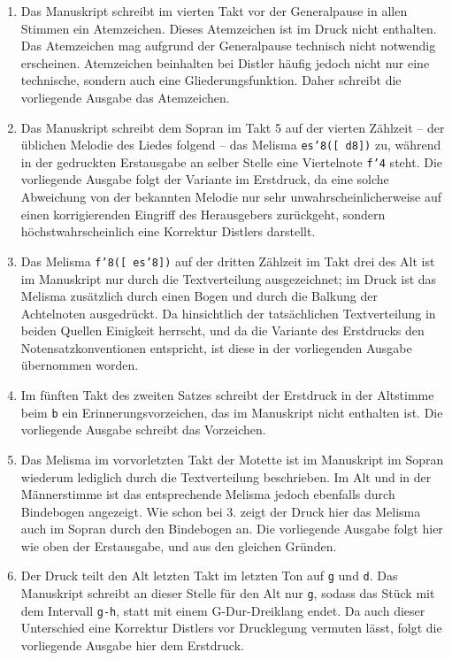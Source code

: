 \documentclass[a4paper]{book}
\begin{document}
\begin{multicols}{2}
\begin{enumerate}
\item
  Das Manuskript schreibt im vierten Takt vor der Generalpause in allen
  Stimmen ein Atemzeichen. Dieses Atemzeichen ist im Druck nicht
  enthalten. Das Atemzeichen mag aufgrund der Generalpause technisch
  nicht notwendig erscheinen. Atemzeichen beinhalten bei Distler häufig
  jedoch nicht nur eine technische, sondern auch eine Gliederungsfunktion. Daher schreibt die vorliegende Ausgabe das Atemzeichen.
\item
  Das Manuskript schreibt dem Sopran im Takt 5 auf der vierten Zählzeit
  -- der üblichen Melodie des Liedes folgend -- das Melisma
  \texttt{es'{}8({[}\ d\textquotesingle{}8{]})} zu, während
  in der gedruckten Erstausgabe an selber Stelle eine Viertelnote
  \texttt{f'{}4} steht. Die vorliegende Ausgabe folgt der
  Variante im Erstdruck, da eine solche Abweichung von der bekannten
  Melodie nur sehr unwahrscheinlicherweise auf einen korrigierenden
  Eingriff des Herausgebers zurückgeht, sondern höchstwahrscheinlich
  eine Korrektur Distlers darstellt.
\item
  Das Melisma \texttt{f'8({[}\ es'8{]})} auf der dritten Zählzeit im Takt
  drei des Alt ist im Manuskript nur durch die Textverteilung
  ausgezeichnet; im Druck ist das Melisma zusätzlich durch einen Bogen
  und durch die Balkung der Achtelnoten ausgedrückt. Da hinsichtlich der
  tatsächlichen Textverteilung in beiden Quellen Einigkeit herrscht, und
  da die Variante des Erstdrucks den Notensatzkonventionen entspricht,
  ist diese in der vorliegenden Ausgabe übernommen worden.
\item
  Im fünften Takt des zweiten Satzes schreibt der Erstdruck in der
  Altstimme beim \texttt{b} ein Erinnerungsvorzeichen, das im Manuskript
  nicht enthalten ist. Die vorliegende Ausgabe schreibt das Vorzeichen.
\item
  Das Melisma im vorvorletzten Takt der Motette ist im Manuskript im
  Sopran wiederum lediglich durch die Textverteilung beschrieben. Im Alt
  und in der Männerstimme ist das entsprechende Melisma jedoch ebenfalls
  durch Bindebogen angezeigt. Wie schon bei 3. zeigt der Druck hier das
  Melisma auch im Sopran durch den Bindebogen an. Die vorliegende
  Ausgabe folgt hier wie oben der Erstausgabe, und aus den gleichen
  Gründen.
\item
  Der Druck teilt den Alt letzten Takt im letzten Ton auf \texttt{g} und
  \texttt{d}. Das Manuskript schreibt an dieser Stelle für den Alt nur
  \texttt{g}, sodass das Stück mit dem Intervall \texttt{g-h}, statt mit
  einem G-Dur-Dreiklang endet. Da auch dieser Unterschied eine Korrektur
  Distlers vor Drucklegung vermuten lässt, folgt die vorliegende Ausgabe
  hier dem Erstdruck.
\end{enumerate}


\end{multicols}
\end{document}
